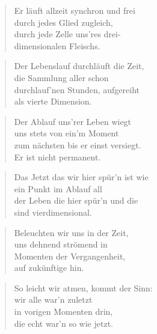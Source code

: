 \documentclass[10pt,a4paper]{article}
\begin{document}
\begin{multicols}{2}
\begin{verse}
Er läuft allzeit synchron und frei \\
durch jedes Glied zugleich, \\
durch jede Zelle uns’res drei- \\
dimensionalen Fleischs. \\
\end{verse}

\begin{verse}
Der Lebenslauf durchläuft die Zeit, \\
die Sammlung aller schon \\
durchlauf’nen Stunden, aufgereiht \\
als vierte Dimension. \\
\end{verse}

\begin{verse}
Der Ablauf uns’rer Leben wiegt \\
uns stets von ein’m Moment \\
zum nächsten bis er einst versiegt. \\
Er ist nicht permanent. \\
\end{verse}

\begin{verse}
Das Jetzt das wir hier spür’n ist wie \\
ein Punkt im Ablauf all \\
der Leben die hier spür’n und die \\
sind vierdimensional. \\
\end{verse}

\begin{verse}
Beleuchten wir uns in der Zeit, \\
uns dehnend strömend in \\
Momenten der Vergangenheit, \\
auf zukünftige hin. \\
\end{verse}

\begin{verse}
So leicht wir atmen, kommt der Sinn: \\
wir alle war’n zuletzt \\
in vorigen Momenten drin, \\
die echt war’n so wie jetzt. \\
\end{verse}


\end{multicols}
\end{document}
